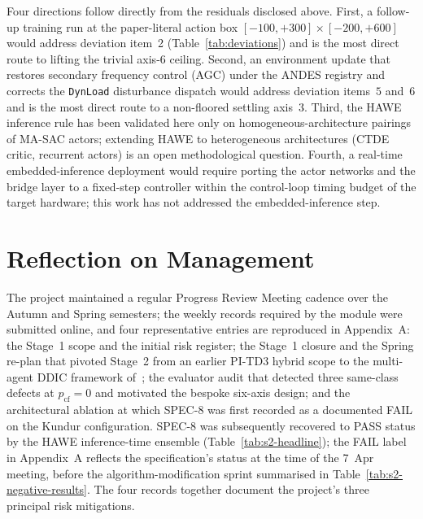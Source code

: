 \documentclass{unnc-fyp}
\begin{document}
Four directions follow directly from the residuals disclosed
above.
First, a follow-up training run at the paper-literal action box
$[-100, +300] \times [-200, +600]$ would address deviation
item~2 (Table~\ref{tab:deviations}) and is the most direct route
to lifting the trivial axis-$6$ ceiling.
Second, an environment update that restores secondary frequency
control (AGC) under the ANDES registry and corrects the
\verb|DynLoad| disturbance dispatch would address deviation
items~$5$ and~$6$ and is the most direct route to a non-floored
settling axis~$3$.
Third, the HAWE inference rule has been validated here only on
homogeneous-architecture pairings of MA-SAC actors; extending
HAWE to heterogeneous architectures (CTDE critic, recurrent
actors) is an open methodological question.
Fourth, a real-time embedded-inference deployment would require
porting the actor networks and the bridge layer to a fixed-step
controller within the control-loop timing budget of the target
hardware; this work has not addressed the embedded-inference
step.

\section{Reflection on Management}
\label{sec:management}

The project maintained a regular Progress Review Meeting cadence
over the Autumn and Spring semesters; the weekly records required
by the module were submitted online, and four representative
entries are reproduced in Appendix~A:
the Stage~1 scope and the initial risk register;
the Stage~1 closure and the Spring re-plan that pivoted Stage~2
from an earlier PI-TD3 hybrid scope to the multi-agent DDIC
framework of~\cite{yang2023ddic};
the evaluator audit that detected three same-class defects at
$p_\mathrm{cf}=0$ and motivated the bespoke six-axis design;
and the architectural ablation at which SPEC-8 was first
recorded as a documented FAIL on the Kundur configuration.
SPEC-8 was subsequently recovered to PASS status by the HAWE
inference-time ensemble (Table~\ref{tab:s2-headline});
the FAIL label in Appendix~A reflects the specification's
status at the time of the 7~Apr meeting, before the
algorithm-modification sprint summarised in
Table~\ref{tab:s2-negative-results}.
The four records together document the project's three
principal risk mitigations.
\end{document}
